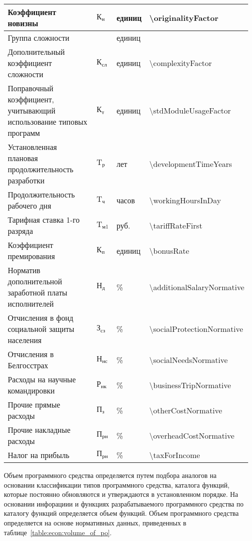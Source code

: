 \begin{longtable}{| >{\raggedright}m{}
              | >{\centering}m{}
              | >{\centering}m{}
              | >{\centering\arraybackslash}m{}|}
\hline
Коэффициент новизны & $ \text{К}_\text{н} $ & единиц & \num{\originalityFactor} \\
\hline
Группа сложности & & единиц & 2 \\
\hline
Дополнительный коэффициент сложности & $ \text{К}_\text{сл} $ & единиц & \num{\complexityFactor} \\
\hline
Поправочный коэффициент, учитывающий использование типовых программ & $ \text{К}_\text{т} $ & единиц & \num{\stdModuleUsageFactor} \\
\hline
Установленная плановая продолжительность разработки & $ \text{T}_\text{р} $ & лет & \num{\developmentTimeYears} \\
\hline
Продолжительность рабочего дня & $ \text{T}_\text{ч} $ & часов & \num{\workingHoursInDay} \\
\hline
Тарифная ставка 1-го разряда & $ \text{T}_\text{м1} $ & руб. & \num{\tariffRateFirst} \\
\hline
Коэффициент премирования & $ \text{К}_\text{п} $ & единиц & \num{\bonusRate} \\
\hline
Норматив дополнительной заработной платы исполнителей & $ \text{Н}_\text{д} $ & \% & \num{\additionalSalaryNormative} \\
\hline
Отчисления в фонд социальной защиты населения & $ \text{З}_\text{сз} $ & \% & \num{\socialProtectionNormative} \\
\hline
Отчисления в Белгосстрах & $ \text{Н}_\text{нс} $ & \% & \num{\socialNeedsNormative} \\
\hline
Расходы на научные командировки & $ \text{Р}_\text{нк} $ & \% & \num{\businessTripNormative} \\
\hline
Прочие прямые расходы & $ \text{П}_\text{з} $ & \% & \num{\otherCostNormative} \\
\hline
Прочие накладные расходы & $ \text{П}_\text{рн} $ & \% & \num{\overheadCostNormative} \\
\hline
Налог на прибыль & $ \text{П}_\text{рн} $ & \% & \num{\taxForIncome} \\
\hline
\end{longtable}

Объем программного средства определяется путем подбора аналогов на основании классификации типов программного средства, каталога функций, которые постоянно обновляются и утверждаются в установленном порядке. На основании инфорациии и функциях разрабатываемого программного средства по каталогу функций определяется объем функций. Объем программного средства определяется на основе нормативных данных, приведенных в таблице~\ref{table:econ:volume_of_po}.

